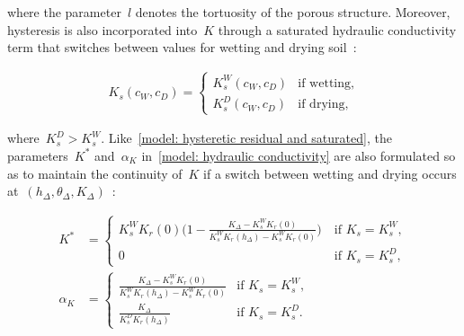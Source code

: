 \documentclass[11pt,a4paper]{article}
\numberwithin{equation}{section}
\begin{document}
where the parameter~$l$ denotes the tortuosity of the porous structure. Moreover, hysteresis is also incorporated into~$K$ through a saturated hydraulic conductivity term that switches between values for wetting and drying soil~\citep{vogel1996hydrus}:
\begin{linenomath*}
	\begin{equation}\label{model: saturated hydraulic conductivity}
		\begin{aligned}
			K_{s}(c_W, c_D) =
			\begin{cases}
				K_s^W(c_W, c_D) &\text{if wetting,}\\
				K_s^D(c_W, c_D) &\text{if drying,}
			\end{cases}
		\end{aligned}
	\end{equation}
\end{linenomath*}
where~$K_s^D>K_s^W$. Like~\eqref{model: hysteretic residual and saturated}, the parameters~$K^*$ and~$\alpha_K$ in~\eqref{model: hydraulic conductivity} are also formulated so as to maintain the continuity of~$K$ if a switch between wetting and drying occurs at~$(h_\Delta,\theta_\Delta, K_\Delta)$~\citep{vogel1996hydrus}:
\begin{linenomath*}
	\begin{equation}\label{model: hydraulic conductivity hysteresis parameters}
		\begin{aligned}
			K^*&= 
			\begin{cases}
				K_s^WK_r(0)\Big(1-\frac{K_\Delta - K_s^WK_r(0)}{K_s^WK_r(h_\Delta) - K_s^WK_r(0)}\Big) \ &\text{if }K_s = K_s^W,\\
				 0 &\text{if }K_s = K_s^D,
			\end{cases}\\
			\alpha_K
			&=
			\begin{cases}
				\frac{K_\Delta-K_s^WK_r(0)}{K_s^WK_r(h_\Delta) - K_s^WK_r(0)}&\text{if }K_s = K_s^W,\\
				\frac{K_\Delta}{K_s^DK_r(h_\Delta)}&\text{if }K_s = K_s^D.
			\end{cases} 			
		\end{aligned}
	\end{equation}
\end{linenomath*}   
\end{document}

